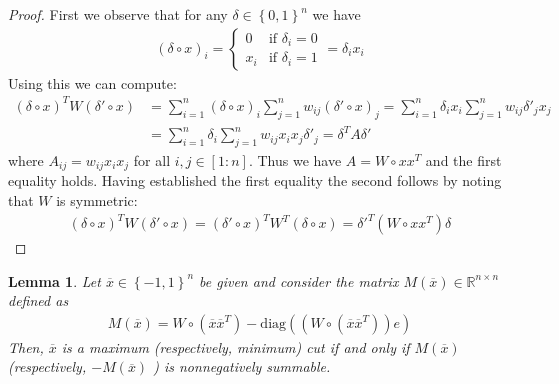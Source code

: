 \documentclass[12pt,a4paper]{article}
\theoremstyle{mythm}
\newtheorem{lem}[thm]{Lemma}
\begin{document}
\begin{proof}
First we observe that for any $ \delta \in \left\{ 0,1 \right\} ^{ n }  $ we have
\begin{align*}
\left( \delta \circ x \right) _{ i } = \begin{cases}
0 & \text{if } \delta_i = 0\\
x_i & \text{if } \delta_i = 1
\end{cases}
= \delta_i x_i
\end{align*} 
Using this we can compute:
\begin{align*}
\left( \delta \circ x \right) ^T W \left( \delta ' \circ x \right) 
&= \sum_{ i = 1 }^{ n } \left( \delta \circ x \right) _{ i } \sum_{ j = 1 }^{ n } w _{ ij } \left( \delta ' \circ x \right) _{ j } 
= \sum_{ i = 1 }^{ n } \delta _{ i } x_i \sum_{ j = 1 }^{ n } w _{ ij } \delta ' _{ j } x_j \\
&= \sum_{ i = 1 }^{ n } \delta_i \sum_{ j = 1 }^{ n } w _{ ij } x_i x_j \delta'_j = \delta ^T A \delta '
\end{align*} 
where $ A _{ ij } = w _{ ij } x_i x_j $ for all $ i,j \in \left[ 1:n \right]  $.
Thus we have $ A = W \circ xx ^T  $ and the first equality holds.
Having established the first equality the second follows by noting that $ W $ is symmetric:
\begin{align*}
\left( \delta \circ x \right) ^T W  \left( \delta ' \circ x \right)  
= \left( \delta' \circ x \right) ^T W ^T \left( \delta \circ x \right) 
= \delta'^T \left( W \circ xx^T \right)  \delta
\end{align*} 
\end{proof}
\begin{lem}
\label{lem:M(x)nonnegsum} 
Let $ \overline{ x } \in \left\{ -1,1 \right\} ^{ n }  $ be given and consider the matrix $ M( \overline{ x } ) \in \mathbb{R} ^{ n \times n }  $ defined as 
\begin{align}
\label{def:M(x)} 
M ( \overline{ x }  ) = W \circ \left( \overline{  x} \overline{ x } ^{ T }  \right) - \text{diag} \left( \left( W \circ \left( \overline{ x } \overline{ x } ^T  \right)
\right) e  \right) 
\end{align} 
Then, $ \overline{ x }  $ is a maximum (respectively, minimum) cut if and only if $ M ( \overline{ x }  )  $ (respectively, $ -M ( \overline{ x }  )  $ )
is nonnegatively summable.
\end{lem} 
\end{document}
